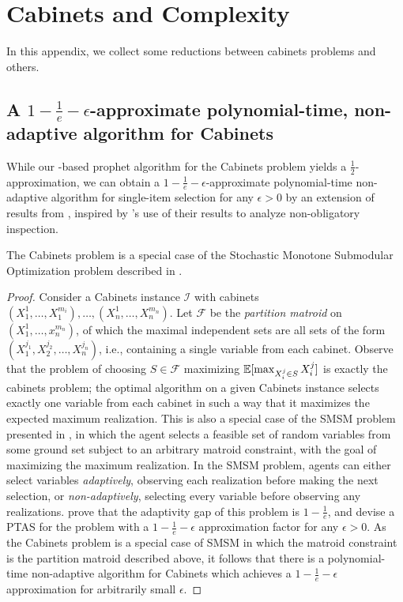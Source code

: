 \section{Cabinets and Complexity} \label{app:complexity}

In this appendix, we collect some reductions between cabinets problems and others.

\subsection{A $1-\frac{1}{e}-\epsilon$-approximate polynomial-time, non-adaptive algorithm for Cabinets}

While our \SAUP{}-based prophet algorithm for the Cabinets problem yields a $\frac{1}{2}$-approximation,
we can obtain a $1-\frac{1}{e}-\epsilon$-approximate polynomial-time non-adaptive algorithm for single-item selection for any $\epsilon > 0$ by an extension of results from
\citet{asadpour2016maximizing}, inspired by \citet{beyhaghi2019pandora}'s use of their results to analyze non-obligatory inspection.
\begin{observation}
The Cabinets problem is a special case of the Stochastic Monotone Submodular Optimization problem described in \citet{asadpour2016maximizing}.
\end{observation}
\begin{proof}
Consider a Cabinets instance $\mathcal{I}$ with cabinets $(X_1^1,\ldots,X_1^{m_i}),\ldots,(X_n^1,\ldots,X_n^{m_n})$.
Let $\mathcal{F}$ be the \emph{partition matroid} on $(X_1^1,\ldots,x_n^{m_n})$, of which the maximal independent sets are all sets of the form
$(X_1^{j_1},X_2^{j_2},\ldots,X_n^{j_n})$, i.e., containing a single variable from each cabinet. Observe that the problem of choosing $S\in\mathcal{F}$
maximizing $\operatorname*{\mathbb{E}}[\max_{X_i^j\in S} X_i^j]$ is exactly the cabinets problem; the optimal algorithm on a given Cabinets instance selects exactly one variable from each cabinet in such a way that it maximizes the expected maximum realization.
This is also a special case of the SMSM problem presented in \citet{asadpour2016maximizing}, in which the agent selects a feasible set of random variables from some ground set subject to an arbitrary matroid constraint, with the goal of maximizing the maximum realization.
In the SMSM problem, agents can either select variables \emph{adaptively}, observing each realization before making the next selection, or \emph{non-adaptively}, selecting every variable before observing any realizations.
\citet{asadpour2016maximizing} prove that the adaptivity gap of this problem is $1-\frac{1}{e}$, and devise a PTAS for the problem with a $1-\frac{1}{e}-\epsilon$ approximation factor for any $\epsilon > 0$.
As the Cabinets problem is a special case of SMSM in which the matroid constraint is the partition matroid described above, it follows that there is a polynomial-time non-adaptive algorithm for Cabinets which achieves a $1-\frac{1}{e}-\epsilon$ approximation for arbitrarily small $\epsilon$.
\end{proof}


